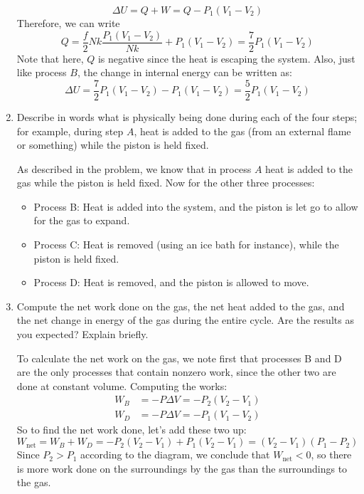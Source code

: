 \documentclass[11pt]{article}
\begin{document}
\begin{enumerate}[label=\alph*)]
\begin{solution}
\[					\Delta U = Q + W = Q - P_1(V_1 - V_2) 				
				\] 
				Therefore, we can write
				\[
					Q = \frac{f}{2}Nk\frac{P_1(V_1 - V_2)}{Nk}  + P_1(V_1 - V_2) = \frac{7}{2}P_1(V_1 - V_2)
				\]		
				Note that here, $Q$ is negative since the heat is escaping the system. Also, just like 
				process $B$, the change in internal energy can be written as:
				\[
				\Delta U = \frac{7}{2}P_1(V_1 - V_2) - P_1( V_1 - V_2) = \frac{5}{2}P_1(V_1 - V_2) 
				\] 
			\end{solution}
		\item Describe in words what is physically being done during each of the four steps; for example, 
			during step $A$, heat is added to the gas (from an external flame or something) while 
			the piston is held fixed.

			\begin{solution}
				As described in the problem, we know that in process $A$ heat is added to the gas while the
				piston is held fixed. Now for the other three processes:
				\begin{itemize}
					\item Process B: Heat is added into the system, and the piston is let go to allow for 
						the gas to expand. 
					\item Process C: Heat is removed (using an ice bath for instance), while the piston is held 
						fixed.
					\item Process D: Heat is removed, and the piston is allowed to move.
				\end{itemize}
			\end{solution}
		\item Compute the net work done on the gas, the net heat added to the gas, and the net change 
			in energy of the gas during the entire cycle. Are the results as you expected? Explain 
			briefly. 

			\begin{solution}
				To calculate the net work on the gas, we note first that processes B and D are the only 
				processes that contain nonzero work, since the other two are done at constant volume. Computing
				the works:
				\begin{align*}
					W_B &= -P\Delta V = -P_2(V_2 - V_1)\\
					W_D &= -P\Delta V = -P_1(V_1 - V_2) 
				\end{align*}
				So to find the net work done, let's add these two up:
				\[
					W_{\text{net}} = W_B + W_D = -P_2(V_2 - V_1) + P_1(V_2 - V_1) = (V_2 - V_1)(P_1 - P_2)
				\] 
				Since $P_2 > P_1$ according to the diagram, we conclude that $W_{\text{net}} < 0$, so 
				there is more work done on the surroundings by the gas than the surroundings to the gas.


\end{solution}
\end{enumerate}
\end{document}
